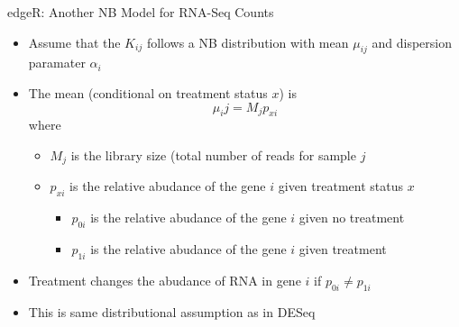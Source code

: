 \documentclass[xcolor=x11names,compress]{beamer}\usepackage[]{graphicx}\usepackage[]{color}
\begin{document}
\begin{frame}{edgeR: Another NB Model for RNA-Seq Counts}
  \begin{itemize}
  \item Assume that the $K_{ij}$ follows a NB distribution with mean $\mu_{ij}$ and dispersion
        paramater $\alpha_i$
  \item The mean (conditional on treatment status $x$) is
    \begin{equation*}
      \mu_ij=M_j p_{xi} 
    \end{equation*}
    where
    \begin{itemize}
    \item $M_j$ is the library size (total number of reads for sample $j$
    \item $p_{xi}$ is the relative abudance of the gene $i$ given treatment status $x$ 
      \begin{itemize}
      \item $p_{0i}$ is the relative abudance of the gene $i$ given no treatment
       \item $p_{1i}$ is the relative abudance of the gene $i$ given treatment
      \end{itemize}
    \end{itemize}
  \item Treatment changes the abudance of RNA in gene $i$ if $p_{0i}\ne p_{1i}$
  \item This is same distributional assumption as in DESeq
  \end{itemize}
\end{frame}



\end{document}
